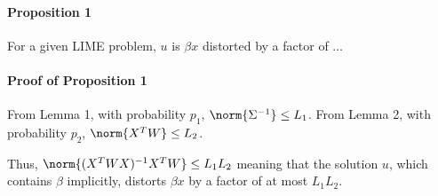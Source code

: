     \paragraph{Proposition 1} 
        For a given LIME problem, $u$ is $\beta x$ distorted by a factor of $\ldots$

    \paragraph{Proof of Proposition 1}
        From Lemma 1, with probability $p_1$, $\norm{\Sigma^{-1}} \leq L_1$.
        From Lemma 2, with probability $p_2$, $\norm{X^T W} \leq L_2$.

        Thus, $\norm{(X^T W X)^{-1} X^T W} \leq L_1 L_2$ meaning that the solution $u$, which contains $\beta$ implicitly, distorts $\beta x$ by a factor of at most $L_1 L_2$. 